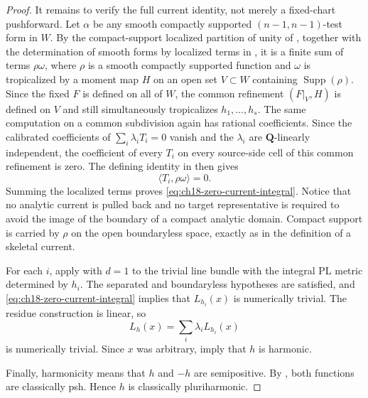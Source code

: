 \begin{proof}
It remains to verify the full current identity, not merely a fixed-chart
pushforward.  Let $\alpha$ be any smooth compactly supported
$(n-1,n-1)$-test form in $W$.  By the compact-support localized partition of
unity of \cite[Corollary~6.2.8]{CLD25}, together with the determination of
smooth forms by localized terms in \cite[Lemma~7.2.5]{CLD25}, it is a
finite sum of terms $\rho\omega$, where $\rho$ is a smooth compactly
supported function and $\omega$ is tropicalized by a moment map $H$ on an
open set $V\subset W$ containing
$\operatorname{Supp}(\rho)$.  Since the fixed $F$ is defined on all of $W$,
the common refinement $(F|_V,H)$ is defined on $V$ and still simultaneously
tropicalizes $h_1,\ldots,h_s$.  The same computation on a common subdivision
again has rational coefficients.  Since the calibrated coefficients of
$\sum_i\lambda_iT_i=0$ vanish and the $\lambda_i$ are $\mathbf Q$-linearly
independent, the coefficient of every $T_i$ on every source-side cell of
this common refinement is zero.  The defining identity in
\cite[Definition~7.5.1]{CLD25} then gives
\[
                         \langle T_i,\rho\omega\rangle=0.
\]
Summing the localized terms proves \eqref{eq:ch18-zero-current-integral}.
Notice that no analytic current is pulled back and no target representative
is required to avoid the image of the boundary of a compact analytic
domain.  Compact support is carried by $\rho$ on the open boundaryless
space, exactly as in the definition of a skeletal current.

For each $i$, apply \cite[Theorem~18.8.4]{CLD25} with $d=1$ to the trivial
line bundle with the integral PL metric determined by $h_i$.  The separated
and boundaryless hypotheses are satisfied, and
\eqref{eq:ch18-zero-current-integral} implies that $L_{h_i}(x)$ is
numerically trivial.  The residue construction is linear, so
\[
                         L_h(x)=\sum_i\lambda_iL_{h_i}(x)
\]
is numerically trivial.  Since $x$ was arbitrary,
\cite[Proposition~7.1 and Definition~7.2]{GJR26} imply that $h$ is harmonic.

Finally, harmonicity means that $h$ and $-h$ are semipositive.  By
, both functions are classically psh.  Hence $h$
is classically pluriharmonic.
\end{proof}
